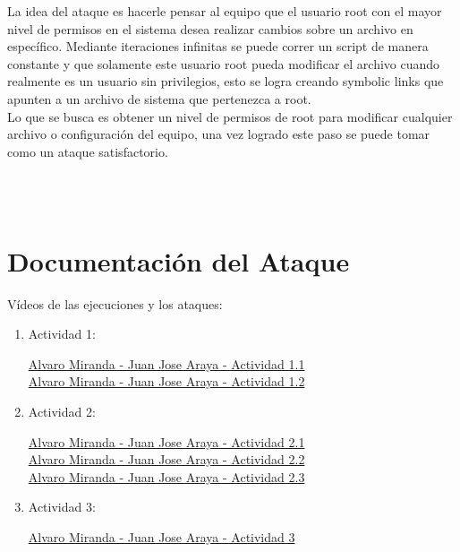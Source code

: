 \documentclass{article}
\begin{document}
La idea del ataque es hacerle pensar al equipo que el usuario root con el mayor nivel de permisos en el sistema desea realizar cambios sobre un archivo en específico. Mediante iteraciones infinitas se puede correr un script de manera constante y que solamente este usuario root pueda modificar el archivo cuando realmente es un usuario sin privilegios, esto se logra creando symbolic links que apunten a un archivo de sistema que pertenezca a root. 
\\ 

Lo que se busca es obtener un nivel de permisos de root para modificar cualquier archivo o configuración del equipo, una vez logrado este paso se puede tomar como un ataque satisfactorio.

\\
\\



\section*{Documentación del Ataque}

Vídeos de las ejecuciones y los ataques: \\

\begin{enumerate}
  \item Actividad 1:

  \href{https://www.loom.com/share/622ec72dc2cb4c658d06e8dee2589afd}{Alvaro Miranda - Juan Jose Araya - Actividad 1.1} \\
  
  \href{https://www.loom.com/share/7ac21ee2b903425195a60f802dd6a9c9}{Alvaro Miranda - Juan Jose Araya - Actividad 1.2} \\
  
  \item Actividad 2:
  
  \href{https://www.loom.com/share/36b82066d6d043168116ed0fc0b293b6}{Alvaro Miranda - Juan Jose Araya - Actividad 2.1} \\
  
  \href{https://www.loom.com/share/6dc3ff3fbb97469085bb2e26dcbf3220}{Alvaro Miranda - Juan Jose Araya - Actividad 2.2} \\
  
  \href{https://www.loom.com/share/466ba0ef96464f9a95a7eb8b19e8fb2f}{Alvaro Miranda - Juan Jose Araya - Actividad 2.3} \\
  
  \item Actividad 3:
  
  \href{https://www.loom.com/share/ae3e916e6bf14555b860367652aa316d}{Alvaro Miranda - Juan Jose Araya - Actividad 3} \\
  
\end{enumerate}
\end{document}
